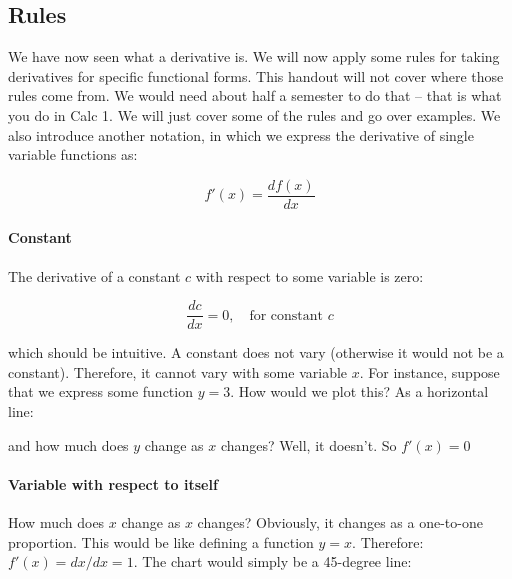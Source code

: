\documentclass[11pt,letterpaper]{article}
\begin{document}
\subsection{Rules} We have now seen what a derivative is. We will now apply some rules for taking derivatives for specific functional forms. This handout will not cover where those rules come from. We would need about half a semester to do that -- that is what you do in Calc 1. We will just cover some of the rules and go over examples. We also introduce another notation, in which we express the derivative of single variable functions as:

\begin{equation*}
    f'(x) = \frac{df(x)}{dx}
\end{equation*}

\paragraph{Constant} The derivative of a constant $c$ with respect to some variable is zero:

\begin{equation*}
    \frac{dc}{dx}  = 0, \quad \text{for constant } c
\end{equation*}

\noindent which should be intuitive. A constant does not vary (otherwise it would not be a constant). Therefore, it cannot vary with some variable $x$. For instance, suppose that we express some function $y=3$. How would we plot this? As a horizontal line:

\begin{center}
\end{center}

\noindent and how much does $y$ change as $x$ changes? Well, it doesn't. So $f'(x)=0$

\paragraph{Variable with respect to itself} How much does $x$ change as $x$ changes? Obviously, it changes as a one-to-one proportion. This would be like defining a function $y=x$. Therefore: $f'(x) = dx/dx = 1$. The chart would simply be a 45-degree line:
\end{document}
